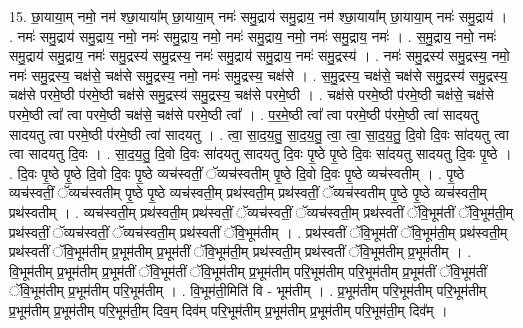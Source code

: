 \documentclass[17pt]{extarticle}
\begin{document}
15. छा॒याया॒म् नमो॒ नम॑ श्छा॒याया᳚म् छा॒याया॒म् नमः॑ समु॒द्राय॑ समु॒द्राय॒ नम॑ श्छा॒याया᳚म् छा॒याया॒म् नमः॑ समु॒द्राय॑ । . नमः॑ समु॒द्राय॑ समु॒द्राय॒ नमो॒ नमः॑ समु॒द्राय॒ नमो॒ नमः॑ समु॒द्राय॒ नमो॒ नमः॑ समु॒द्राय॒ नमः॑ । . स॒मु॒द्राय॒ नमो॒ नमः॑ समु॒द्राय॑ समु॒द्राय॒ नमः॑ समु॒द्रस्य॑ समु॒द्रस्य॒ नमः॑ समु॒द्राय॑ समु॒द्राय॒ नमः॑ समु॒द्रस्य॑ । . नमः॑ समु॒द्रस्य॑ समु॒द्रस्य॒ नमो॒ नमः॑ समु॒द्रस्य॒ चक्ष॑से॒ चक्ष॑से समु॒द्रस्य॒ नमो॒ 
नमः॑ समु॒द्रस्य॒ चक्ष॑से । . स॒मु॒द्रस्य॒ चक्ष॑से॒ चक्ष॑से समु॒द्रस्य॑ समु॒द्रस्य॒ चक्ष॑से परमे॒ष्ठी प॑रमे॒ष्ठी चक्ष॑से समु॒द्रस्य॑ समु॒द्रस्य॒ चक्ष॑से परमे॒ष्ठी । . चक्ष॑से परमे॒ष्ठी प॑रमे॒ष्ठी चक्ष॑से॒ चक्ष॑से परमे॒ष्ठी त्वा᳚ त्वा परमे॒ष्ठी चक्ष॑से॒ चक्ष॑से परमे॒ष्ठी त्वा᳚ । . प॒र॒मे॒ष्ठी त्वा᳚ त्वा परमे॒ष्ठी प॑रमे॒ष्ठी त्वा॑ सादयतु सादयतु त्वा परमे॒ष्ठी प॑रमे॒ष्ठी त्वा॑ सादयतु । . त्वा॒ सा॒द॒य॒तु॒ सा॒द॒य॒तु॒ त्वा॒ त्वा॒ सा॒द॒य॒तु॒ दि॒वो दि॒वः सा॑दयतु त्वा त्वा सादयतु दि॒वः । . सा॒द॒य॒तु॒ दि॒वो दि॒वः सा॑दयतु सादयतु दि॒वः पृ॒ष्ठे पृ॒ष्ठे दि॒वः सा॑दयतु सादयतु दि॒वः पृ॒ष्ठे । . दि॒वः पृ॒ष्ठे पृ॒ष्ठे दि॒वो दि॒वः पृ॒ष्ठे व्यच॑स्वतीं॒ ॅव्यच॑स्वतीम् पृ॒ष्ठे दि॒वो दि॒वः पृ॒ष्ठे व्यच॑स्वतीम् । . पृ॒ष्ठे व्यच॑स्वतीं॒ ॅव्यच॑स्वतीम् पृ॒ष्ठे पृ॒ष्ठे व्यच॑स्वती॒म् प्रथ॑स्वती॒म् प्रथ॑स्वतीं॒ ॅव्यच॑स्वतीम् पृ॒ष्ठे पृ॒ष्ठे व्यच॑स्वती॒म् प्रथ॑स्वतीम् । . व्यच॑स्वती॒म् प्रथ॑स्वती॒म् प्रथ॑स्वतीं॒ ॅव्यच॑स्वतीं॒ ॅव्यच॑स्वती॒म् प्रथ॑स्वतीं ॅवि॒भूम॑तीं ॅवि॒भूम॑ती॒म् प्रथ॑स्वतीं॒ ॅव्यच॑स्वतीं॒ ॅव्यच॑स्वती॒म् प्रथ॑स्वतीं ॅवि॒भूम॑तीम् । . प्रथ॑स्वतीं ॅवि॒भूम॑तीं ॅवि॒भूम॑ती॒म् प्रथ॑स्वती॒म् प्रथ॑स्वतीं ॅवि॒भूम॑तीम् प्र॒भूम॑तीम् प्र॒भूम॑तीं ॅवि॒भूम॑ती॒म् प्रथ॑स्वती॒म् प्रथ॑स्वतीं ॅवि॒भूम॑तीम् प्र॒भूम॑तीम् । . वि॒भूम॑तीम् प्र॒भूम॑तीम् प्र॒भूम॑तीं ॅवि॒भूम॑तीं ॅवि॒भूम॑तीम् प्र॒भूम॑तीम् परि॒भूम॑तीम् परि॒भूम॑तीम् प्र॒भूम॑तीं ॅवि॒भूम॑तीं ॅवि॒भूम॑तीम् प्र॒भूम॑तीम् परि॒भूम॑तीम् । . वि॒भूम॑ती॒मिति॑ वि - भूम॑तीम् । . प्र॒भूम॑तीम् परि॒भूम॑तीम् परि॒भूम॑तीम् प्र॒भूम॑तीम् प्र॒भूम॑तीम् परि॒भूम॑ती॒म् दिव॒म् दिव॑म् परि॒भूम॑तीम् प्र॒भूम॑तीम् प्र॒भूम॑तीम् परि॒भूम॑ती॒म् दिव᳚म् । \newline
\end{document}
